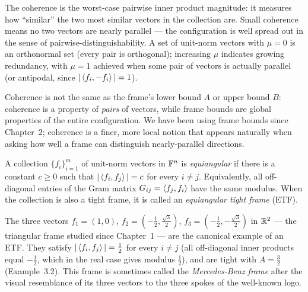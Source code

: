 The coherence is the worst-case pairwise inner product magnitude: it
measures how ``similar'' the two most similar vectors in the collection
are. Small coherence means no two vectors are nearly parallel --- the
configuration is well spread out in the sense of
pairwise-distinguishability. A set of unit-norm vectors with
$\mu=0$ is an orthonormal set (every pair is orthogonal); increasing
$\mu$ indicates growing redundancy, with $\mu=1$ achieved when some pair
of vectors is actually parallel (or antipodal, since $|\left\langle f_i, -f_i \right\rangle|=1$).

\begin{remark*}
Coherence is not the same as the frame's lower bound $A$ or upper bound
$B$: coherence is a property of \emph{pairs} of vectors, while frame
bounds are global properties of the entire configuration. We have been
using frame bounds since Chapter~2; coherence is a finer, more local
notion that appears naturally when asking how well a frame can
distinguish nearly-parallel directions.
\end{remark*}

\begin{definition}
\label{def:equiangular}
A collection $\{f_i\}_{i=1}^m$ of unit-norm vectors in $\mathbb{F}^n$ is
\emph{equiangular} if there is a constant $c\ge0$ such that
$|\left\langle f_i, f_j \right\rangle|=c$ for every $i\ne j$. Equivalently, all off-diagonal
entries of the Gram matrix $G_{ij}=\left\langle f_j, f_i \right\rangle$ have the same
modulus. When the collection is also a tight frame, it is called an
\emph{equiangular tight frame} (ETF).
\end{definition}

\begin{examplebox}[title={Example 9.1: The Mercedes-Benz frame}]
\label{ex:mercedes-benz}
The three vectors $f_1=(1,0)$, $f_2=(-\tfrac12,\tfrac{\sqrt3}{2})$,
$f_3=(-\tfrac12,-\tfrac{\sqrt3}{2})$ in $\mathbb{R}^2$ --- the triangular frame
studied since Chapter~1 --- are the canonical example of an ETF. They
satisfy $|\left\langle f_i, f_j \right\rangle|=\tfrac12$ for every $i\ne j$ (all
off-diagonal inner products equal $-\tfrac12$, which in the real case
gives modulus $\tfrac12$), and are tight with $A=\tfrac32$
(Example~3.2). This frame is sometimes called the \emph{Mercedes-Benz
frame} after the visual resemblance of its three vectors to the three
spokes of the well-known logo.
\end{examplebox}

